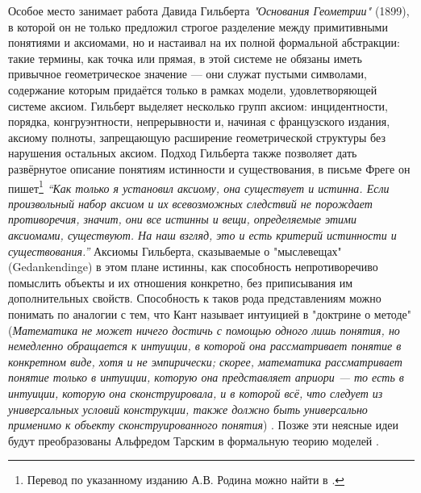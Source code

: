 \documentclass[14pt]{extarticle}
\begin{document}
	Особое место занимает работа Давида Гильберта \textit{"Основания Геометрии" }(1899), в которой он не только предложил строгое разделение между примитивными понятиями и аксиомами, но и настаивал на их полной формальной абстракции: такие термины, как точка или прямая, в этой системе не обязаны иметь привычное геометрическое значение — они служат пустыми символами, содержание которым придаётся только в рамках модели, удовлетворяющей системе аксиом. Гильберт выделяет несколько групп аксиом: инцидентности, порядка, конгруэнтности, непрерывности и, начиная с французского издания, аксиому полноты, запрещающую расширение геометрической структуры без нарушения остальных аксиом. Подход Гильберта также позволяет дать развёрнутое описание понятиям истинности и существования, в письме Фреге он пишет\footnote{Перевод по указанному изданию А.В. Родина можно найти в \cite[290]{rodin2020}.} \textit{“Как только я установил аксиому, она существует и истинна. Если произвольный набор аксиом и их всевозможных следствий не порождает противоречия, значит, они все истинны и вещи, определяемые этими аксиомами, существуют. На наш взгляд, это и есть критерий истинности и существования.”} \cite[39]{frege1980correspondence} Аксиомы Гильберта, сказываемые о "мыслевещах" (Gedankendinge) в этом плане истинны, как способность непротиворечиво помыслить объекты и их отношения конкретно, без приписывания им дополнительных свойств. Способность к таков рода представлениям можно понимать по аналогии с тем, что Кант называет интуицией в "доктрине о методе"(\textit{Математика не может ничего достичь с помощью одного лишь понятия, но немедленно обращается к интуиции, в которой она рассматривает понятие в конкретном виде, хотя и не эмпирически; скорее, математика рассматривает понятие только в интуиции, которую она представляет априори — то есть в интуиции, которую она сконструировала, и в которой всё, что следует из универсальных условий конструкции, также должно быть универсально применимо к объекту сконструированного понятия}) \cite[395]{kant1994critique}. Позже эти неясные идеи будут преобразованы Альфредом Тарским в формальную теорию моделей \cite{Tarski1956}.
	
\end{document}
